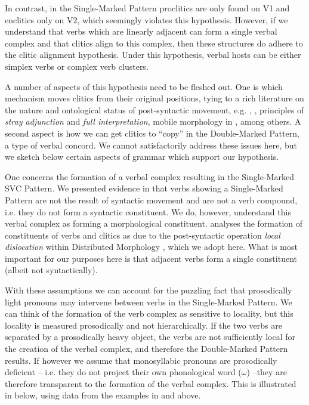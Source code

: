 \documentclass[output=paper]{langsci/langscibook}
\begin{document}
In contrast, in the Single-Marked Pattern proclitics are only found on V1 and enclitics only on V2, which seemingly violates this hypothesis. However, if we understand that verbs which are linearly adjacent can form a single verbal complex and that clitics align to this complex, then these structures do adhere to the clitic alignment hypothesis. Under this hypothesis, verbal hosts can be either simplex verbs or complex verb clusters.

A number of aspects of this hypothesis need to be fleshed out. One is which mechanism moves clitics from their original positions, tying to a rich literature on the nature and ontological status of post-syntactic movement, e.g. \citet{NesporVogel1986}, \citet{Bošković2001},  principles of \textit{stray adjunction} and\textit{ full interpretation}, mobile morphology in \citet{JenksRose2015}, among others. A second aspect is how we can get clitics to “copy” in the Double-Marked Pattern, a type of verbal concord. We cannot satisfactorily address these issues here, but we sketch below certain aspects of  grammar which support our hypothesis. 

One concerns the formation of a verbal complex resulting in the Single-Marked SVC Pattern. We presented evidence in  that verbs showing a Single-Marked Pattern are not the result of syntactic movement and are not a verb compound, i.e. they do not form a syntactic constituent. We do, however, understand this verbal complex as forming a morphological constituent. \citet{Rolle2015} analyses the formation of constituents of verbs and clitics as due to the post-syntactic operation \textit{local dislocation} within Distributed Morphology \citep{EmbickNoyer2001,EmbickNoyer2007}, which we adopt here. What is most important for our purposes here is that adjacent verbs form a single constituent (albeit not syntactically). 

With these assumptions we can account for the puzzling fact that prosodically light pronouns may intervene between verbs in the Single-Marked Pattern. We can think of the formation of the verb complex as sensitive to locality, but this locality is measured prosodically and not hierarchically. If the two verbs are separated by a prosodically heavy object, the verbs are not sufficiently local for the creation of the verbal complex, and therefore the Double-Marked Pattern results. If however we assume that monosyllabic pronouns are prosodically deficient – i.e. they do not project their own phonological word ($\omega $) –they are therefore transparent to the formation of the verbal complex. This is illustrated in  below, using data from the examples in  and  above. 
\end{document}
